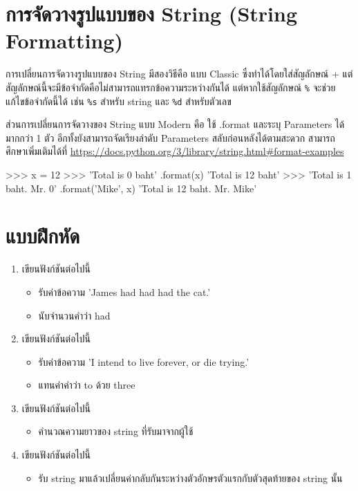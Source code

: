 \section{การจัดวางรูปแบบของ String (String Formatting)}

การเปลี่ยนการจัดวางรูปแบบของ String มีสองวิธีคือ แบบ Classic ซึ่งทำได้โดยใส่สัญลักษณ์ + แต่สัญลักษณ์นี้จะมีข้อจำกัดคือไม่สามารถแทรกข้อความระหว่างกันได้ แต่หากใช้สัญลักษณ์ \texttt{\%} จะช่วยแก้ไขข้อจำกัดนี้ได้ เช่น \texttt{\%s} สำหรับ string และ \texttt{\%d} สำหรับตัวเลข 

\begin{pycode}
\end{pycode}

\begin{pycode}
\end{pycode}



ส่วนการเปลี่ยนการจัดวางของ String แบบ Modern คือ ใช้ .format และระบุ Parameters ได้มากกว่า 1 ตัว อีกทั้งยังสามารถจัดเรียงลำดับ Parameters สลับก่อนหลังได้ตามสะดวก สามารถศึกษาเพิ่มเติมได้ที่ \url{https://docs.python.org/3/library/string.html\#format-examples}

\begin{pycode}
>>> x = 12
>>> 'Total is {0} baht' .format(x)
'Total is 12 baht'
>>> 'Total is {1} baht. Mr. {0}' .format('Mike', x)
'Total is 12 baht. Mr. Mike'
\end{pycode}


\section{แบบฝึกหัด}
\begin{enumerate} 
\item 	เขียนฟังก์ชันต่อไปนี้
\begin{itemize}
\item 	รับค่าข้อความ 'James had had had the cat.'
\item 	นับจำนวนคำว่า had
\end{itemize}
\item 	เขียนฟังก์ชันต่อไปนี้
\begin{itemize}
\item 	รับค่าข้อความ  'I intend to live forever, or die trying.'
\item 	แทนค่าคำว่า to ด้วย three
\end{itemize}
\item 	เขียนฟังก์ชันต่อไปนี้
\begin{itemize}
\item 	คำนวณความยาวของ string ที่รับมาจากผู้ใช้
\end{itemize}
\item 	เขียนฟังก์ชันต่อไปนี้
\begin{itemize}
\item 	รับ string มาแล้วเปลี่ยนค่ากลับกันระหว่างตัวอักษรตัวแรกกับตัวสุดท้ายของ string นั้น
\end{itemize}
\end{enumerate}


